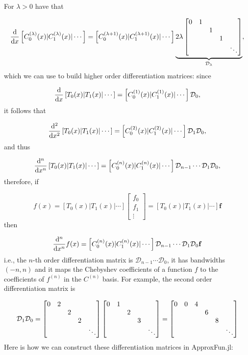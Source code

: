 \documentclass[12pt,a4paper]{article}
\begin{document}
For $\lambda > 0$ have that

\[
{{\rm d} \over {\rm d}x}\left[C_0^{(\lambda)}(x) | C_1^{(\lambda)}(x) | \cdots \right] = \left[C_0^{(\lambda+1)}(x) | C_1^{(\lambda+1)}(x) | \cdots \right]\underbrace{2\lambda\begin{bmatrix}
0 & 1 \cr
&& 1 \cr
&&& 1 \cr
&&&&\ddots
\end{bmatrix}}_{\mathcal{D}_{\lambda}},
\]
which we can use to build higher order differentiation matrices: since

\[
{{\rm d} \over {\rm d}x}\left[T_0(x) | T_1(x) | \cdots \right] = \left[C_0^{(1)}(x) | C_1^{(1)}(x) | \cdots \right]\mathcal{D}_0,
\]
it follows that

\[
{{\rm d}^2 \over {\rm d}x^2}\left[T_0(x) | T_1(x) | \cdots \right] = \left[C_0^{(2)}(x) | C_1^{(2)}(x) | \cdots \right]\mathcal{D}_1\mathcal{D}_0,
\]
and thus

\[
{{\rm d}^n \over {\rm d}x^n}\left[T_0(x) | T_1(x) | \cdots \right] = \left[C_0^{(n)}(x) | C_1^{(n)}(x) | \cdots \right]\mathcal{D}_{n-1}\cdots\mathcal{D}_1\mathcal{D}_0,
\]
therefore, if

\[
f(x) = \left[T_0(x) | T_1(x) | \cdots \right]\begin{bmatrix}
f_0 \\
f_1 \\
\vdots
\end{bmatrix} = \left[T_0(x) | T_1(x) | \cdots \right]\mathbf{f}
\]
then

\[
{{\rm d}^n \over {\rm d}x^n}f(x) = \left[C_0^{(n)}(x) | C_1^{(n)}(x) | \cdots \right]\mathcal{D}_{n-1}\cdots\mathcal{D}_1\mathcal{D}_0\mathbf{f}
\]
i.e., the $n$-th order differentiation matrix is $\mathcal{D}_{n-1}\cdots\mathcal{D}_0$, it has bandwidths $(-n, n)$ and it maps the Chebyshev coefficients of a function $f$ to the coefficients of $f^{(n)}$ in the $C^{(n)}$ basis. For example, the second order differentiation matrix is

\[
\mathcal{D}_1\mathcal{D}_0 = 
\begin{bmatrix}
0 & 2 \cr
&& 2 \cr
&&& 2 \cr
&&&&\ddots
\end{bmatrix}\begin{bmatrix}
0 & 1 \cr
&& 2 \cr
&&& 3 \cr
&&&&\ddots
\end{bmatrix} = \begin{bmatrix}
0 & 0 & 4 \cr
&&& 6 \cr
&&& & 8 \cr
&&&& &\ddots
\end{bmatrix}
\]
Here is how we can construct these differentiation matrices in ApproxFun.jl:
\end{document}
